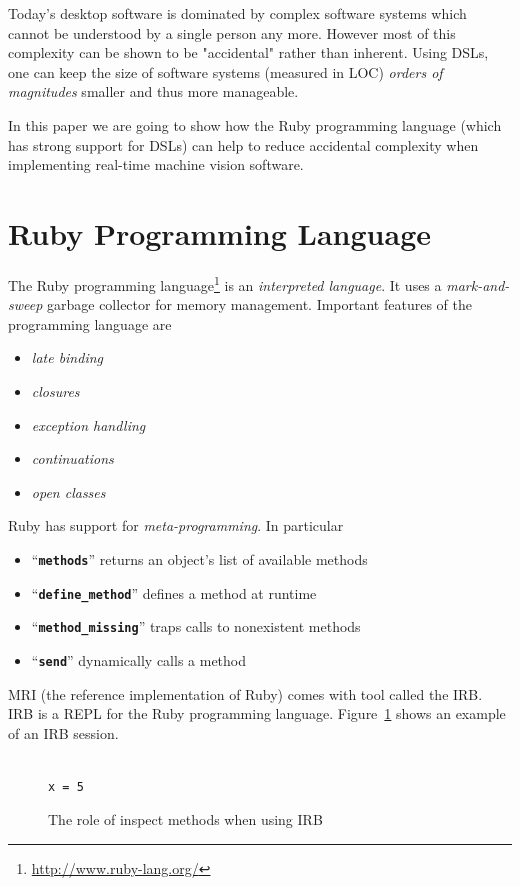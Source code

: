 \documentclass[10pt,journal,compsoc]{joser13}
\newcommand{\code}[1]{``\texttt{\textbf{\textcolor{codegray}{\small{#1}}}}''}
\newcommand{\fig}[1]{Figure~\ref{fig:#1}}
\begin{document}
Today's desktop software is dominated by complex software systems which cannot
be understood by a single person any more. However most of this complexity can
be shown to be "accidental" rather than inherent\citep{ohshima2013kscript}.
Using \acp{DSL}, one can keep the size of software systems (measured in LOC)
\emph{orders of magnitudes} smaller and thus more
manageable\citep{kay2010steps}.

In this paper we are going to show how the Ruby programming language (which has
strong support for DSLs) can help to reduce accidental complexity when
implementing real-time machine vision software.

\section{Ruby Programming Language}
The Ruby programming language\footnote{\url{http://www.ruby-lang.org/}} is an
\emph{interpreted language}. It uses a \emph{mark-and-sweep} garbage collector
for memory management. Important features of the programming language are
\begin{itemize}
  \item \emph{late binding}
  \item \emph{closures}
  \item \emph{exception handling}
  \item \emph{continuations}
  \item \emph{open classes}
\end{itemize}

Ruby has support for \emph{meta-programming}. In particular
\begin{itemize}
  \item \code{methods} returns an object's list of available methods
  \item \code{define\_method} defines a method at runtime
  \item \code{method\_missing} traps calls to nonexistent methods
  \item \code{send} dynamically calls a method
\end{itemize}

\ac{MRI} (the reference implementation of Ruby) comes with tool called the
\ac{IRB}. \ac{IRB} is a \ac{REPL} for the Ruby programming language. \fig{repl}
shows an example of an \ac{IRB} session.

\begin{figure}[htbp]
  \begin{center}
    \begin{minipage}[b]{.8\columnwidth}
      \lstset{language=Ruby,frame=single,numbers=none}
      \begin{lstlisting}

x = 5
      \end{lstlisting}
    \end{minipage}
  \end{center}
  \caption{The role of inspect methods when using IRB\label{fig:repl}}
\end{figure}
\end{document}
